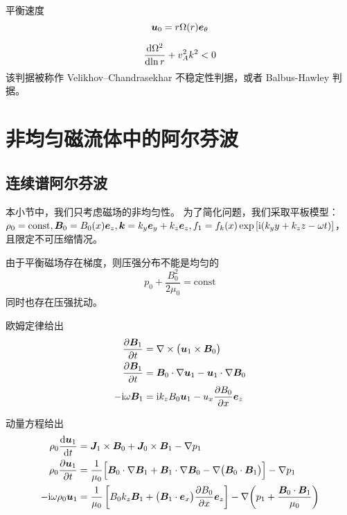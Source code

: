 平衡速度
\begin{equation}
\bm{u}_0 = r \Omega(r) \bm{e}_\theta
\end{equation}

\begin{equation}
\frac{\mathop{}\!\mathrm{d} {\Omega^2}}{\mathop{}\!\mathrm{d} {\ln{r}}} + v_A^2 k^2 < 0
\end{equation}
该判据被称作 Velikhov–Chandrasekhar 不稳定性判据，或者 Balbus-Hawley 判据。

\section{非均匀磁流体中的阿尔芬波}

\subsection{连续谱阿尔芬波}

本小节中，我们只考虑磁场的非均匀性。
为了简化问题，我们采取平板模型：
$\rho_0 = \text{const}, \bm{B}_0 = B_0(x) \bm{e}_z, \bm{k} = k_y \bm{e}_y + k_z \bm{e}_z, f_1 = f_k(x) \exp{[\mathrm{i}(k_y y + k_z z - \omega t)]}$，
且限定不可压缩情况。

由于平衡磁场存在梯度，则压强分布不能是均匀的
\begin{equation}
p_0 + \frac{B_0^2}{2 \mu_0} = \text{const}
\end{equation}
同时也存在压强扰动。

欧姆定律给出
\begin{equation}\begin{aligned}
\frac{\partial {\bm{B}_1}}{\partial {t}} &= \nabla \times {\big( \bm{u}_1 \times \bm{B}_0 \big)} \\
\frac{\partial {\bm{B}_1}}{\partial {t}} &= \bm{B}_0 \cdot \nabla {\bm{u}_1} - \bm{u}_1 \cdot \nabla {\bm{B}_0} \\
- \mathrm{i} \omega \bm{B}_1 &= \mathrm{i} k_z B_0 \bm{u}_1 - u_x \frac{\partial {B_0}}{\partial {x}} \bm{e}_z
\end{aligned}\end{equation}

动量方程给出
\begin{equation}\begin{aligned}
\rho_0 \frac{\mathop{}\!\mathrm{d} {\bm{u}_1}}{\mathop{}\!\mathrm{d} {t}} &= \bm{J}_1 \times \bm{B}_0 + \bm{J}_0 \times \bm{B}_1 - \nabla {p_1} \\
\rho_0 \frac{\partial {\bm{u}_1}}{\partial {t}} &= \frac{1}{\mu_0} \Big[
    \bm{B}_0 \cdot \nabla {\bm{B}_1}
    + \bm{B}_1 \cdot \nabla {\bm{B}_0}
    - \nabla {\big( \bm{B}_0 \cdot \bm{B}_1 \big) }
\Big] - \nabla {p_1} \\
- \mathrm{i} \omega \rho_0 \bm{u}_1 &
= \frac{1}{\mu_0} \left[
    B_0 k_z \bm{B}_1
    + \big( \bm{B}_1 \cdot \bm{e}_x \big) \frac{\partial {B_0}}{\partial {x}} \bm{e}_z
\right] - \nabla {\left( p_1 + \frac{\bm{B}_0 \cdot \bm{B}_1}{\mu_0} \right)}
\end{aligned}\end{equation}

